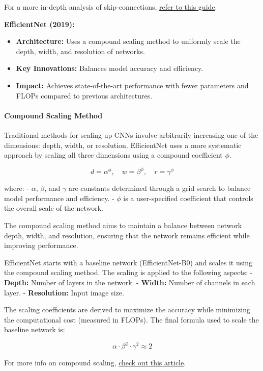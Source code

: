 \documentclass[12pt]{article}
\begin{document}
For a more in-depth analysis of skip-connections, \href{https://theaisummer.com/skip-connections/}{refer to this guide}. 

\textbf{EfficientNet (2019):}
\begin{itemize}
    \item \textbf{Architecture:} Uses a compound scaling method to uniformly scale the depth, width, and resolution of networks.
    \item \textbf{Key Innovations:} Balances model accuracy and efficiency.
    \item \textbf{Impact:} Achieves state-of-the-art performance with fewer parameters and FLOPs compared to previous architectures.
\end{itemize}

\paragraph{Compound Scaling Method}

Traditional methods for scaling up CNNs involve arbitrarily increasing one of the dimensions: depth, width, or resolution. EfficientNet uses a more systematic approach by scaling all three dimensions using a compound coefficient \( \phi \).

\[
d = \alpha^\phi, \quad w = \beta^\phi, \quad r = \gamma^\phi
\]

where:
- \( \alpha \), \( \beta \), and \( \gamma \) are constants determined through a grid search to balance model performance and efficiency.
- \( \phi \) is a user-specified coefficient that controls the overall scale of the network.

The compound scaling method aims to maintain a balance between network depth, width, and resolution, ensuring that the network remains efficient while improving performance.

EfficientNet starts with a baseline network (EfficientNet-B0) and scales it using the compound scaling method. The scaling is applied to the following aspects:
- \textbf{Depth:} Number of layers in the network.
- \textbf{Width:} Number of channels in each layer.
- \textbf{Resolution:} Input image size.

The scaling coefficients are derived to maximize the accuracy while minimizing the computational cost (measured in FLOPs). The final formula used to scale the baseline network is:

\[
\alpha \cdot \beta^2 \cdot \gamma^2 \approx 2
\]

For more info on compound scaling, \href{https://arjun-sarkar786.medium.com/understanding-efficientnet-the-most-powerful-cnn-architecture-eaeb40386fad}{check out this article}.
\end{document}

